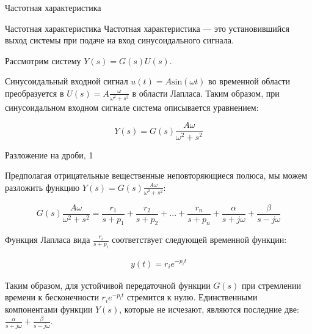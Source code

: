 \documentclass{beamer}
\begin{document}
\begin{frame}{Частотная характеристика}
	\begin{flushleft}
		
		\begin{block}{Частотная характеристика}
			Частотная характеристика — это установившийся выход системы при подаче на вход синусоидального сигнала.
		\end{block}
		
		\bigskip
		
		Рассмотрим систему $Y(s) = G(s)U(s)$. 
		
		\bigskip
		
		Синусоидальный входной сигнал $u(t) = A \text{sin}(\omega t)$ во временной области преобразуется в $U(s) = A \frac{\omega}{\omega^2 + s^2}$ в области Лапласа. Таким образом, при синусоидальном входном сигнале система описывается уравнением:
		
		\begin{equation}
			Y(s) = G(s)\frac{A \omega}{\omega^2 + s^2}
		\end{equation}
		
	\end{flushleft}
\end{frame}



\begin{frame}{Разложение на дроби, 1}
	\begin{flushleft}
		
		Предполагая отрицательные вещественные неповторяющиеся полюса, мы можем разложить функцию $Y(s) = G(s)\frac{A \omega}{\omega^2 + s^2}$:
		
		\begin{equation*}
			G(s)\frac{A \omega}{\omega^2 + s^2} = \frac{r_1}{s + p_1} + \frac{r_2}{s + p_2} + ... + \frac{r_n}{s + p_n} + \frac{\alpha}{s + j\omega} + \frac{\beta}{s - j\omega}
		\end{equation*}		
		
		Функция Лапласа вида $\frac{r_i}{s + p_i}$ соответствует следующей временной функции:
		
		\begin{align}
			y(t) = r_i e^{-p_i t}
		\end{align} 
		
		Таким образом, для устойчивой передаточной функции $G(s)$ при стремлении времени к бесконечности $r_i e^{-p_i t}$ стремится к нулю. Единственными компонентами функции $Y(s)$, которые не исчезают, являются последние две: $\frac{\alpha}{s + j\omega} + \frac{\beta}{s - j\omega}$.
		
	\end{flushleft}
\end{frame}
\end{document}
